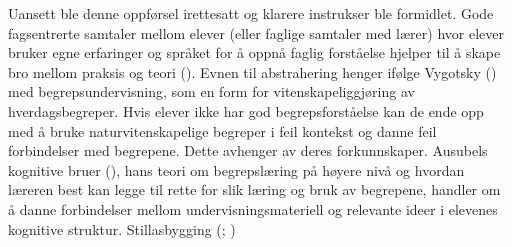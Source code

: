 \documentclass[main.tex]{subfiles}
\begin{document}
Uansett ble denne oppførsel irettesatt og klarere instrukser ble formidlet.
\newline
\newline
Gode fagsentrerte samtaler mellom elever (eller faglige samtaler med lærer) hvor elever bruker egne 
erfaringer og språket for å oppnå faglig forståelse hjelper til å skape bro mellom praksis og teori 
().
\newline
\newline
Evnen til abstrahering henger ifølge Vygotsky () med begrepsundervisning, som en
form for vitenskapeliggjøring av hverdagsbegreper. Hvis elever ikke har god begrepsforståelse
kan de ende opp med å bruke naturvitenskapelige begreper i feil kontekst og danne feil 
forbindelser med begrepene. Dette avhenger av deres forkunnskaper. Ausubels kognitive bruer 
(), hans teori om begrepslæring på høyere nivå og hvordan læreren best kan 
legge til rette for slik læring og bruk av begrepene,  handler om å danne forbindelser mellom 
undervisningsmateriell og relevante ideer i elevenes kognitive struktur.
\newline
\newline
Stillasbygging (; )

\end{document}
